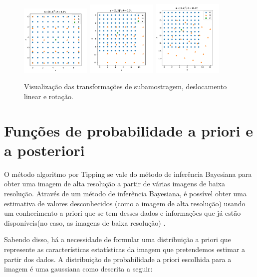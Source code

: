 \documentclass[12pt,openright,oneside,a4paper,english,brazil]{abntex2}
\begin{document}
\begin{figure}
	\centering
	\includegraphics[width=0.3\textwidth]{./figures/transform1.pdf}
	\includegraphics[width=0.3\textwidth]{./figures/transform2.pdf}
	\includegraphics[width=0.3\textwidth]{./figures/transform3.pdf}
	\caption{Visualização das transformações de subamostragem, deslocamento linear e rotação.}
	\label{fig:transformations}
\end{figure}


\section{Funções de probabilidade a priori e a posteriori}

O método algoritmo por Tipping se vale do método de inferência Bayesiana para obter uma imagem de alta resolução a partir de várias imagens de baixa resolução.
Através de um método de inferência Bayesiana, é possível obter uma estimativa de valores desconhecidos (como a imagem de alta resolução) usando um conhecimento a priori que se tem desses dados e informações que já estão disponíveis(no caso, as imagens de baixa resolução) \cite{therrien2011probability}.

Sabendo disso, há a necessidade de formular uma distribuição a priori que represente as características estatísticas da imagem que pretendemos estimar a partir dos dados.
A distribuição de probabilidade a priori escolhida para a imagem é uma gaussiana como descrita a seguir:
\end{document}
